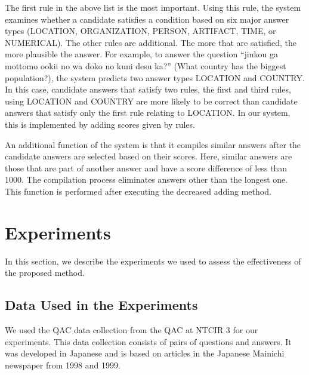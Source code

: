 The first rule in the above list is the most important. 
Using this rule, the system 
examines whether 
a candidate satisfies a condition based on 
six major answer types (LOCATION, ORGANIZATION, PERSON, 
ARTIFACT, TIME, or NUMERICAL). 
The other rules are additional. 
The more that are satisfied, 
the more plausible the answer. 
For example, to answer the question 
``jinkou ga mottomo ookii no wa doko no kuni desu ka?''
(What country has the biggest population?), 
the system predicts two answer types LOCATION and COUNTRY. 
In this case, 
candidate answers that satisfy
two rules, the first and 
third rules, using LOCATION and COUNTRY 
are more likely to be correct 
than 
candidate answers that satisfy
only the first rule relating to LOCATION. 
In our system, 
this is implemented by adding scores given by rules. 

An additional function of the system is 
that it compiles similar answers after the candidate answers are selected based 
on their scores. 
Here, similar answers are those that are part of another answer
and have a score difference of less than 1000. 
The compilation process eliminates answers other than the longest one. 
This function is performed after executing the decreased adding method. 


\section{Experiments}
\label{sec:experiments}

In this section, we describe 
the experiments we used to assess 
the effectiveness of the proposed method. 

\subsection{Data Used in the Experiments}
\label{sec:data}

We used the QAC data collection 
from the QAC at NTCIR 3
for our experiments. 
This data collection consists of 
pairs of questions and answers.
It was developed in Japanese 
and is based on articles in the Japanese Mainichi newspaper from 1998 and 1999. 

